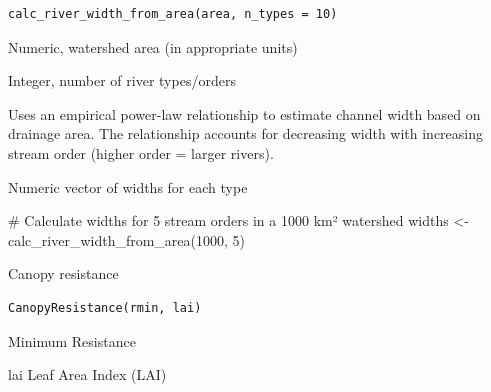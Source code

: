 \documentclass[a4paper]{book}
\begin{document}
%
\begin{Usage}
\begin{verbatim}
calc_river_width_from_area(area, n_types = 10)
\end{verbatim}
\end{Usage}
%
\begin{Arguments}
\begin{ldescription}
\item[\code{area}] Numeric, watershed area (in appropriate units)

\item[\code{n\_types}] Integer, number of river types/orders
\end{ldescription}
\end{Arguments}
%
\begin{Details}\relax
Uses an empirical power-law relationship to estimate channel width
based on drainage area. The relationship accounts for decreasing width
with increasing stream order (higher order = larger rivers).
\end{Details}
%
\begin{Value}
Numeric vector of widths for each type
\end{Value}
%
\begin{Examples}
\begin{ExampleCode}
# Calculate widths for 5 stream orders in a 1000 km² watershed
widths <- calc_river_width_from_area(1000, 5)
\end{ExampleCode}
\end{Examples}
%
\begin{Description}\relax
Canopy resistance
\end{Description}
%
\begin{Usage}
\begin{verbatim}
CanopyResistance(rmin, lai)
\end{verbatim}
\end{Usage}
%
\begin{Arguments}
\begin{ldescription}
\item[\code{rmin}] Minimum Resistance 
\end{ldescription}
\end{Arguments}
%
\begin{Value}
lai Leaf Area Index (LAI) 
\end{Value}
\end{document}
